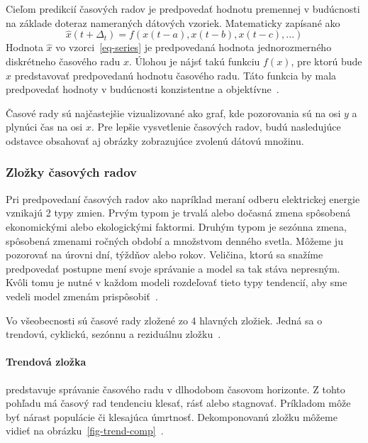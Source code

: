 \documentclass[a4paper,slovak,12pt,appendix]{article}
\begin{document}
Cieľom predikcií časových radov je predpovedať hodnotu premennej v budúcnosti
na základe doteraz nameraných dátových vzoriek. Matematicky zapísané ako
\begin{equation}
  \hat{x}(t+\Delta_t) = f(x(t-a), x(t-b), x(t-c), ...)
  \label{eq-series}
\end{equation}
Hodnota $\hat{x}$ vo vzorci~\ref{eq-series} je predpovedaná hodnota
jednorozmerného diskrétneho časového radu $x$. Úlohou je nájsť takú funkciu
$f(x)$, pre ktorú bude $\hat{x}$ predstavovať predpovedanú hodnotu časového
radu. Táto funkcia by mala predpovedať hodnoty v budúcnosti konzistentne
a objektívne~\cite{Sapankevych2009}.

Časové rady sú najčastejšie vizualizované ako graf, kde pozorovania sú na
osi $y$ a plynúci čas na osi $x$. Pre lepšie vysvetlenie časových radov, budú
nasledujúce odstavce obsahovať aj obrázky zobrazujúce zvolenú dátovú
množinu.

\subsubsection{Zložky časových radov}
Pri predpovedaní časových radov ako napríklad meraní odberu elektrickej energie
vznikajú 2 typy zmien. Prvým typom je trvalá alebo dočasná zmena spôsobená
ekonomickými alebo ekologickými faktormi. Druhým typom je sezónna zmena,
spôsobená zmenami ročných období a množstvom denného svetla. Môžeme ju pozorovať
na úrovni dní, týždňov alebo rokov. Veličina, ktorú sa snažíme predpovedať
postupne mení svoje správanie a model sa tak stáva nepresným. Kvôli tomu je
nutné v každom modeli rozdeľovať tieto typy tendencií, aby sme vedeli model
zmenám prispôsobiť~\cite{Grmanova2016}.

Vo všeobecnosti sú časové rady zložené zo 4 hlavných zložiek. Jedná sa
o trendovú, cyklickú, sezónnu a reziduálnu zložku~\cite{Agrawal2013}.

\paragraph{Trendová zložka} predstavuje správanie časového radu v dlhodobom
časovom horizonte. Z tohto pohľadu má časový rad tendenciu klesať, rásť alebo
stagnovať. Príkladom môže byť nárast populácie či klesajúca
úmrtnosť. Dekomponovanú zložku môžeme vidieť na
obrázku~\ref{fig-trend-comp}~\cite{Agrawal2013}.
\end{document}
